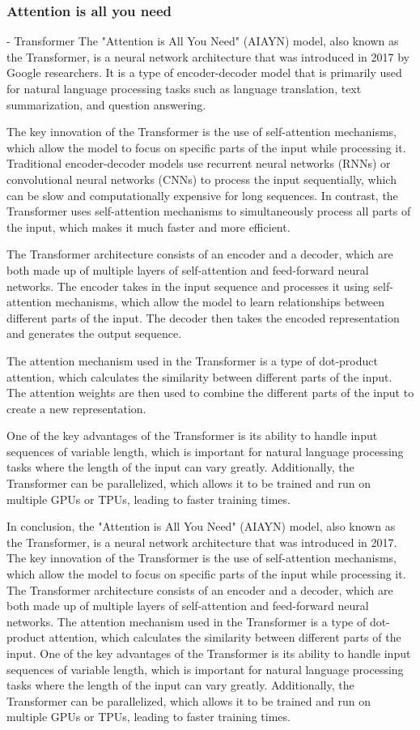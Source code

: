 \subsubsection{Attention is all you need}
- Transformer
The "Attention is All You Need" (AIAYN) model, also known as the Transformer, is a neural network architecture that was introduced in 2017 by Google researchers. It is a type of encoder-decoder model that is primarily used for natural language processing tasks such as language translation, text summarization, and question answering.

The key innovation of the Transformer is the use of self-attention mechanisms, which allow the model to focus on specific parts of the input while processing it. Traditional encoder-decoder models use recurrent neural networks (RNNs) or convolutional neural networks (CNNs) to process the input sequentially, which can be slow and computationally expensive for long sequences. In contrast, the Transformer uses self-attention mechanisms to simultaneously process all parts of the input, which makes it much faster and more efficient.

The Transformer architecture consists of an encoder and a decoder, which are both made up of multiple layers of self-attention and feed-forward neural networks. The encoder takes in the input sequence and processes it using self-attention mechanisms, which allow the model to learn relationships between different parts of the input. The decoder then takes the encoded representation and generates the output sequence.

The attention mechanism used in the Transformer is a type of dot-product attention, which calculates the similarity between different parts of the input. The attention weights are then used to combine the different parts of the input to create a new representation.

One of the key advantages of the Transformer is its ability to handle input sequences of variable length, which is important for natural language processing tasks where the length of the input can vary greatly. Additionally, the Transformer can be parallelized, which allows it to be trained and run on multiple GPUs or TPUs, leading to faster training times.

In conclusion, the "Attention is All You Need" (AIAYN) model, also known as the Transformer, is a neural network architecture that was introduced in 2017. The key innovation of the Transformer is the use of self-attention mechanisms, which allow the model to focus on specific parts of the input while processing it. The Transformer architecture consists of an encoder and a decoder, which are both made up of multiple layers of self-attention and feed-forward neural networks. The attention mechanism used in the Transformer is a type of dot-product attention, which calculates the similarity between different parts of the input. One of the key advantages of the Transformer is its ability to handle input sequences of variable length, which is important for natural language processing tasks where the length of the input can vary greatly. Additionally, the Transformer can be parallelized, which allows it to be trained and run on multiple GPUs or TPUs, leading to faster training times.

